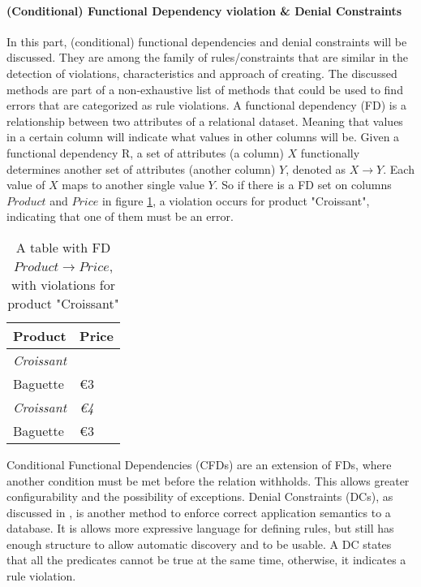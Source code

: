 \paragraph{(Conditional) Functional Dependency violation \& Denial Constraints}
In this part, (conditional) functional dependencies and denial constraints will be discussed. They are among the family of rules/constraints that are similar in the detection of violations, characteristics and approach of creating. The discussed methods are part of a non-exhaustive list of methods that could be used to find errors that are categorized as rule violations. 
A functional dependency (FD) is a relationship between two attributes of a relational dataset. Meaning that values in a certain column will indicate what values in other columns will be. Given a functional dependency R, a set of attributes (a column) $X$ functionally determines another set of attributes (another column) $Y$, denoted as $X \rightarrow Y$. Each value of $X$ maps to another single value $Y$. So if there is a FD set on columns $Product$ and $Price$ in figure \ref{tab:functionaldependencyviol}, a violation occurs for product "Croissant", indicating that one of them must be an error.

\begin{table}[]
\centering
\begin{tabular}{ll}
\textbf{Product}   & \textbf{Price} \\ \hline
\textit{Croissant} & \textit{\texteuro 2}    \\
Baguette           & €3             \\
\textit{Croissant} & \textit{€4}    \\
Baguette           & €3            
\end{tabular}
\caption{A table with FD $Product \rightarrow Price$, with violations for product "Croissant"}
\label{tab:functionaldependencyviol}
\end{table}

Conditional Functional Dependencies (CFDs) are an extension of FDs, where another condition must be met before the relation withholds. This allows greater configurability and the possibility of exceptions. Denial Constraints (DCs), as discussed in \cite{Chu2013-qe}, is another method to enforce correct application semantics to a database. It is allows more expressive language for defining rules, but still has enough structure to allow automatic discovery and to be usable. A DC states that all the predicates cannot be true at the same time, otherwise, it indicates a rule violation.

